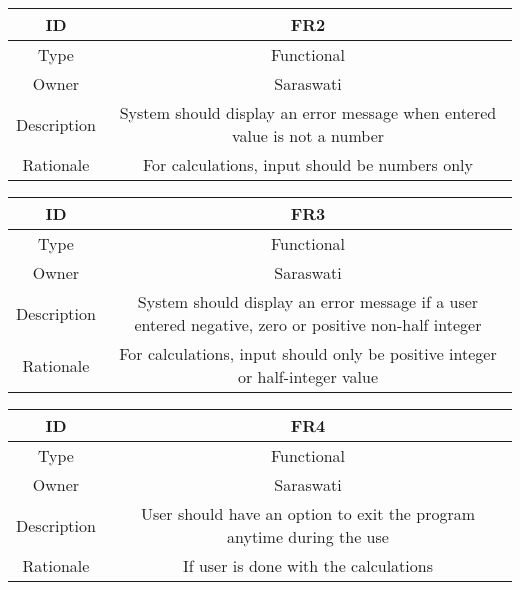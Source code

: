 \documentclass[a4paper,12pt]{article}
\begin{document}
        \begin{center}
        \begin{tabular}{||c c||} 
         \hline
         ID & FR2 \\ 
         \hline
         Type & Functional \\
         \hline
         Owner & Saraswati \\
         \hline
         Description & System should display an error message when entered value is not a number \\
         \hline
         Rationale & For calculations, input should be numbers only \\
         \hline
        \end{tabular}
        \end{center}
        
        \begin{center}
        \begin{tabular}{||c c||} 
         \hline
         ID & FR3 \\ 
         \hline
         Type & Functional \\
         \hline
         Owner & Saraswati \\
         \hline
         Description & System should display an error message if a user entered negative, zero or positive non-half integer \\
         \hline
         Rationale & For calculations, input should only be positive integer or half-integer value \\
         \hline
        \end{tabular}
        \end{center}
        
        \begin{center}
        \begin{tabular}{||c c||} 
         \hline
         ID & FR4 \\ 
         \hline
         Type & Functional \\
         \hline
         Owner & Saraswati \\
         \hline
         Description & User should have an option to exit the program anytime during the use \\
         \hline
         Rationale & If user is done with the calculations \\
         \hline
        \end{tabular}
        \end{center}
        
\end{document}
